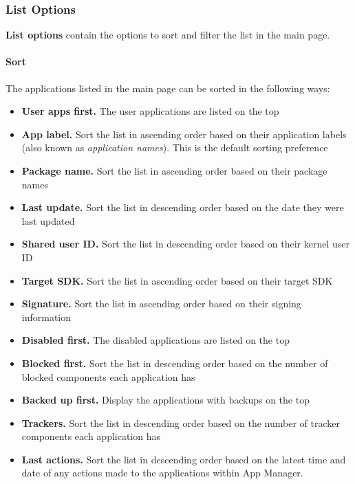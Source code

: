 \subsubsection{List Options}\label{subsubsec:main-list-options} %
\textbf{List options} contain the options to sort and filter the list in the main page.

\paragraph{Sort}\hypertarget{par:main-page-sort}{} %
The applications listed in the main page can be sorted in the following ways:
\begin{itemize}
    \item \textbf{User apps first.} The user applications are listed on the top
    \item \textbf{App label.} Sort the list in ascending order based on their application labels (also known as
    \textit{application names}). This is the default sorting preference
    \item \textbf{Package name.} Sort the list in ascending order based on their package names
    \item \textbf{Last update.} Sort the list in descending order based on the date they were last updated
    \item \textbf{Shared user ID.} Sort the list in descending order based on their kernel user ID
    \item \textbf{Target SDK.} Sort the list in ascending order based on their target SDK
    \item \textbf{Signature.} Sort the list in ascending order based on their signing information
    \item \textbf{Disabled first.} The disabled applications are listed on the top
    \item \textbf{Blocked first.} Sort the list in descending order based on the number of blocked components each
    application has
    \item \textbf{Backed up first.} Display the applications with backups on the top
    \item \textbf{Trackers.} Sort the list in descending order based on the number of tracker components each
    application has
    \item \textbf{Last actions.} Sort the list in descending order based on the latest time and date of any actions made
    to the applications within App Manager.
\end{itemize}

